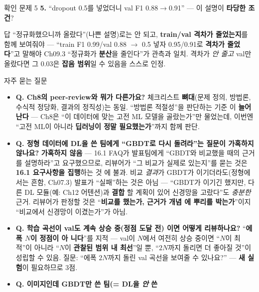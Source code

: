 \documentclass[aspectratio=169,11pt]{beamer}
\begin{document}
\begin{frame}{확인 문제 5}
  \small
  \textbf{5.} ``dropout 0.5를 넣었더니 val F1 0.88$\to$0.91'' —
  이 설명이 \textbf{타당한 조건}?
  \begin{block}{답}
    ``정규화했으니까 올랐다''(나쁜 설명)로는 안 되고,
    \textbf{train/val 격차가 줄었는지}를 함께 보여줘야 —
    ``train F1 0.99/val 0.88 $\to$ 0.5 넣자 0.95/0.91로
    \textbf{격차가 줄었다}''고 말해야 Ch09.3 ``정규화가
    \textbf{분산}을 줄인다''가 관측과 일치. 격차가 \textit{안
    줄고} val만 올랐다면 그 0.03은 \textbf{잡음 범위}일 수
    있음을 스스로 인정.
  \end{block}
\end{frame}

\begin{frame}{자주 묻는 질문}
  \scriptsize
  \begin{itemize}
    \item \textbf{Q. Ch8의 peer-review와 뭐가 다른가요?} \;
      체크리스트 \textbf{뼈대}(문제 정의, 방법론, 수식적 정당화,
      결과의 정직성)는 동일. ``방법론 적절성''을 판단하는 기준
      이 \textbf{늘어난다} — Ch8은 ``이 데이터에 맞는 고전 ML
      모델을 골랐는가''만 물었는데, 이번엔 ``고전 ML이 아니라
      \textbf{딥러닝이 정말 필요했는가}''까지 함께 판단.
    \item \textbf{Q. 정형 데이터에 DL을 쓴 팀에게 ``GBDT로 다시
      돌려라''는 질문이 가혹하지 않나요?} \; \textbf{가혹하지
      않음} — 16.1 FAQ가 발표팀에게 ``GBDT와 비교했을 때의 근거를
      설명하라''고 요구했으므로, 리뷰어가 ``그 비교가 실제로
      있는지''를 묻는 것은 \textbf{16.1 요구사항을 집행}하는 것
      에 불과. 비교 \textit{결과}가 GBDT가 이기더라도(정형에서는
      흔함, Ch07.3) 발표가 ``실패''하는 것은 아님 — ``GBDT가
      이기긴 했지만, 다른 DL 모듈(예: Ch12 어텐션)과 \textbf{결합
      }할 계획이 있어 신경망을 고랐다''도 \textit{충분한} 근거.
      리뷰어가 판정할 것은 ``\textbf{비교를 했는가, 근거가 개념
      에 뿌리를 박는가}''이지 ``비교에서 신경망이 이겼는가''가
      아님.
    \item \textbf{Q. 학습 곡선이 val도 계속 상승 중(정점 도달 전)
      이면 어떻게 리뷰하나요?} \; ``\textbf{에폭 $N$이 정점이 아
      니다}''를 지적 — val이 $N$에서 여전히 상승 중이면 ``$N$이
      최적''이 아니라 ``$N$이 \textbf{관찰된 범위 내 최선}''일
      뿐, ``$2N$까지 돌리면 더 좋아질 것''이 성립할 수 있음. 질문:
      ``에폭 \textbf{$2N$}까지 돌린 val 곡선을 보여줄 수 있나요?''
      — \textbf{새 실험}이 필요하므로 3점.
    \item \textbf{Q. 이미지인데 GBDT만 쓴 팀(= DL을 \textit{안} 쓴
}
\end{itemize}
\end{frame}
\end{document}
